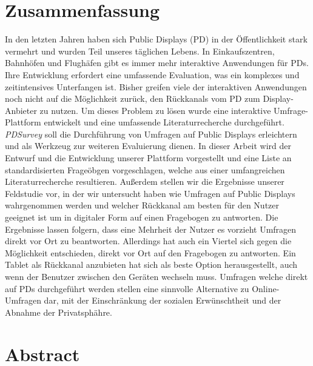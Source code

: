 
\section*{Zusammenfassung}

	In den letzten Jahren haben sich Public Displays (PD) in der {\"O}ffentlichkeit stark vermehrt und wurden Teil unseres t{\"a}glichen Lebens. In Einkaufszentren, Bahnh{\"o}fen und Flugh{\"a}fen gibt es immer mehr interaktive Anwendungen f{\"u}r PDs. Ihre Entwicklung erfordert eine umfassende Evaluation, was ein komplexes und zeitintensives Unterfangen ist. Bisher greifen viele der interaktiven Anwendungen noch nicht auf die M{\"o}glichkeit zur{\"u}ck, den R{\"u}ckkanals vom PD zum Display-Anbieter zu nutzen. Um dieses Problem zu l{\"o}sen wurde eine interaktive Umfrage-Plattform entwickelt und eine umfassende Literaturrecherche durchgef{\"u}hrt. \textit{PDSurvey} soll die Durchf{\"u}hrung von Umfragen auf Public Displays erleichtern und als Werkzeug zur weiteren Evaluierung dienen. In dieser Arbeit wird der Entwurf und die Entwicklung unserer Plattform vorgestellt und eine Liste an standardisierten Frage{\"o}bgen vorgeschlagen, welche aus einer umfangreichen Literaturrecherche resultieren. Au{\ss}erdem stellen wir die Ergebnisse unserer Feldstudie vor, in der wir untersucht haben wie Umfragen auf Public Displays wahrgenommen werden und welcher R{\"u}ckkanal am besten f{\"u}r den Nutzer geeignet ist um in digitaler Form auf einen Fragebogen zu antworten.
	Die Ergebnisse lassen folgern, dass eine Mehrheit der Nutzer es vorzieht Umfragen direkt vor Ort zu beantworten. Allerdings hat auch ein Viertel sich gegen die M{\"o}glichkeit entschieden, direkt vor Ort auf den Fragebogen zu antworten. Ein Tablet als R{\"u}ckkanal anzubieten hat sich als beste Option herausgestellt, auch wenn der Benutzer zwischen den Ger{\"a}ten wechseln muss. Umfragen welche direkt auf PDs durchgef{\"u}hrt werden stellen eine sinnvolle Alternative zu Online-Umfragen dar, mit der Einschr{\"a}nkung der sozialen Erw{\"u}nschtheit und der Abnahme der Privatsph{\"a}hre.


\section*{Abstract}

